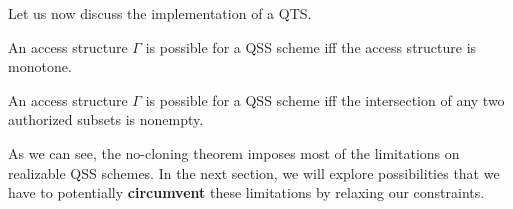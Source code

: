 Let us now discuss the implementation of a QTS.

\theoremstyle{theorem}
\begin{theorem}
    An access structure $\Gamma$ is possible for a QSS scheme iff the access structure is monotone.
\end{theorem}

\theoremstyle{theorem}
\begin{theorem}
    An access structure $\Gamma$ is possible for a QSS scheme iff the intersection of any two authorized subsets is nonempty.
\end{theorem}

As we can see, the no-cloning theorem imposes most of the limitations on realizable QSS schemes. In the next section, we will explore possibilities that we have to potentially \textbf{circumvent} these limitations by relaxing our constraints. 

